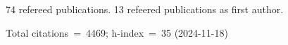74 refereed publications. 13 refeered publications as first author.

Total citations~=~4469; h-index~=~35 (2024-11-18)